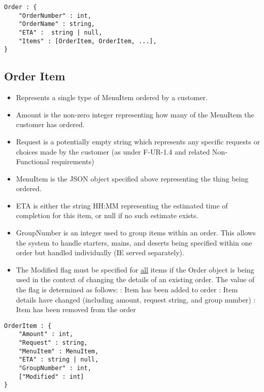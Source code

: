\documentclass[12pt, a4paper]{article}
\begin{document}
\begin{verbatim}
Order : {
	"OrderNumber" : int,
	"OrderName" : string,
	"ETA" :  string | null,
	"Items" : [OrderItem, OrderItem, ...],
}
\end{verbatim}
\pagebreak
\subsection{Order Item}

\begin{itemize}
\item Represents a single type of MenuItem ordered by a customer.
\item Amount is the non-zero integer representing how many of the MenuItem the customer has ordered.
\item Request is a potentially empty string which represents any specific requests or choices made by the customer (as under F-UR-1.4 and related Non-Functional requirements)
\item MenuItem is the JSON object specified above representing the thing being ordered.
\item ETA is either the string HH:MM representing the estimated time of completion for this item, or null if no such estimate exists.
\item GroupNumber is an integer used to group items within an order. This allows the system to handle starters, mains, and deserts being specified within one order but handled individually (IE served separately).
\item The Modified flag must be specified for \underline{all} items if the Order object is being used in the context of changing the details of an existing order. The value of the flag is determined as follows:
 : Item has been added to order
 : Item details have changed (including amount, request string, and group number)
 : Item has been removed from the order
\end{itemize}

\begin{verbatim}
OrderItem : {
	"Amount" : int,
	"Request" : string,
	"MenuItem" : MenuItem,
	"ETA" : string | null,
	"GroupNumber" : int,
	["Modified" : int]
}
\end{verbatim}
\end{document}
